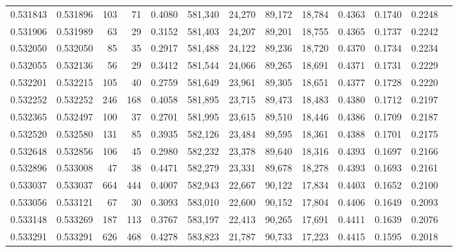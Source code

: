 \begin{tabular}{rrrrrrrrrrrrr}
0.531843 & 0.531896 &   103 &    71 &                                     0.4080 & 581,340 &  24,270 &  89,172 &  18,784 & 0.4363 & 0.1740 & 0.2248 \\
0.531906 & 0.531989 &    63 &    29 &                                     0.3152 & 581,403 &  24,207 &  89,201 &  18,755 & 0.4365 & 0.1737 & 0.2242 \\
0.532050 & 0.532050 &    85 &    35 &                                     0.2917 & 581,488 &  24,122 &  89,236 &  18,720 & 0.4370 & 0.1734 & 0.2234 \\
0.532055 & 0.532136 &    56 &    29 &                                     0.3412 & 581,544 &  24,066 &  89,265 &  18,691 & 0.4371 & 0.1731 & 0.2229 \\
0.532201 & 0.532215 &   105 &    40 &                                     0.2759 & 581,649 &  23,961 &  89,305 &  18,651 & 0.4377 & 0.1728 & 0.2220 \\
0.532252 & 0.532252 &   246 &   168 &                                     0.4058 & 581,895 &  23,715 &  89,473 &  18,483 & 0.4380 & 0.1712 & 0.2197 \\
0.532365 & 0.532497 &   100 &    37 &                                     0.2701 & 581,995 &  23,615 &  89,510 &  18,446 & 0.4386 & 0.1709 & 0.2187 \\
0.532520 & 0.532580 &   131 &    85 &                                     0.3935 & 582,126 &  23,484 &  89,595 &  18,361 & 0.4388 & 0.1701 & 0.2175 \\
0.532648 & 0.532856 &   106 &    45 &                                     0.2980 & 582,232 &  23,378 &  89,640 &  18,316 & 0.4393 & 0.1697 & 0.2166 \\
0.532896 & 0.533008 &    47 &    38 &                                     0.4471 & 582,279 &  23,331 &  89,678 &  18,278 & 0.4393 & 0.1693 & 0.2161 \\
0.533037 & 0.533037 &   664 &   444 &                                     0.4007 & 582,943 &  22,667 &  90,122 &  17,834 & 0.4403 & 0.1652 & 0.2100 \\
0.533056 & 0.533121 &    67 &    30 &                                     0.3093 & 583,010 &  22,600 &  90,152 &  17,804 & 0.4406 & 0.1649 & 0.2093 \\
0.533148 & 0.533269 &   187 &   113 &                                     0.3767 & 583,197 &  22,413 &  90,265 &  17,691 & 0.4411 & 0.1639 & 0.2076 \\
0.533291 & 0.533291 &   626 &   468 &                                     0.4278 & 583,823 &  21,787 &  90,733 &  17,223 & 0.4415 & 0.1595 & 0.2018 \\

\end{tabular}
